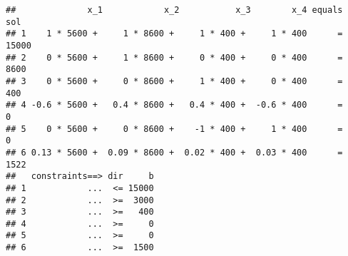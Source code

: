 \documentclass[]{article}
\newenvironment{Shaded}{\begin{snugshade}}{\end{snugshade}}
\newcommand{\KeywordTok}[1]{\textcolor[rgb]{0.13,0.29,0.53}{\textbf{#1}}}
\newcommand{\DataTypeTok}[1]{\textcolor[rgb]{0.13,0.29,0.53}{#1}}
\newcommand{\DecValTok}[1]{\textcolor[rgb]{0.00,0.00,0.81}{#1}}
\newcommand{\CharTok}[1]{\textcolor[rgb]{0.31,0.60,0.02}{#1}}
\newcommand{\StringTok}[1]{\textcolor[rgb]{0.31,0.60,0.02}{#1}}
\newcommand{\OtherTok}[1]{\textcolor[rgb]{0.56,0.35,0.01}{#1}}
\newcommand{\ControlFlowTok}[1]{\textcolor[rgb]{0.13,0.29,0.53}{\textbf{#1}}}
\newcommand{\OperatorTok}[1]{\textcolor[rgb]{0.81,0.36,0.00}{\textbf{#1}}}
\newcommand{\NormalTok}[1]{#1}
\begin{document}
\begin{Shaded}
\end{Shaded}

\begin{verbatim}
##              x_1            x_2           x_3        x_4 equals   sol
## 1    1 * 5600 +     1 * 8600 +     1 * 400 +     1 * 400      = 15000
## 2    0 * 5600 +     1 * 8600 +     0 * 400 +     0 * 400      =  8600
## 3    0 * 5600 +     0 * 8600 +     1 * 400 +     0 * 400      =   400
## 4 -0.6 * 5600 +   0.4 * 8600 +   0.4 * 400 +  -0.6 * 400      =     0
## 5    0 * 5600 +     0 * 8600 +    -1 * 400 +     1 * 400      =     0
## 6 0.13 * 5600 +  0.09 * 8600 +  0.02 * 400 +  0.03 * 400      =  1522
##   constraints==> dir     b
## 1            ...  <= 15000
## 2            ...  >=  3000
## 3            ...  >=   400
## 4            ...  >=     0
## 5            ...  >=     0
## 6            ...  >=  1500
\end{verbatim}
\end{document}
